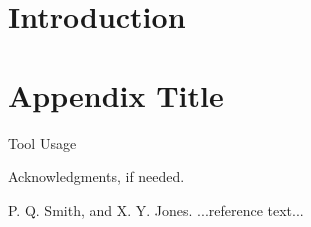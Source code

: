 \documentclass[preprint]{sigplanconf}
\begin{document}
\section{Introduction}





\appendix
\section{Appendix Title}
Tool Usage 
\acks

Acknowledgments, if needed.





\begin{thebibliography}{}
\softraggedright

P. Q. Smith, and X. Y. Jones. ...reference text...

\end{thebibliography}
\end{document}
